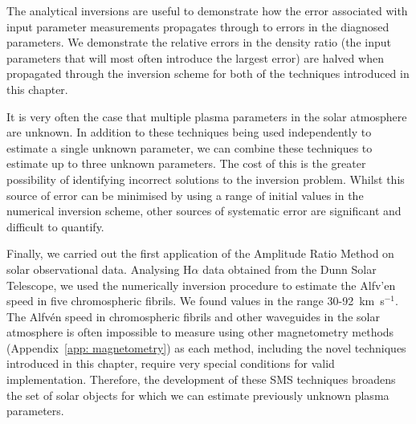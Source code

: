 The analytical inversions are useful to demonstrate how the error associated with input parameter measurements propagates through to errors in the diagnosed parameters. We demonstrate the relative errors in the density ratio (the input parameters that will most often introduce the largest error) are halved when propagated through the inversion scheme for both of the techniques introduced in this chapter.

It is very often the case that multiple plasma parameters in the solar atmosphere are unknown. In addition to these techniques being used independently to estimate a single unknown parameter, we can combine these techniques to estimate up to three unknown parameters. The cost of this is the greater possibility of identifying incorrect solutions to the inversion problem. Whilst this source of error can be minimised by using a range of initial values in the numerical inversion scheme, other sources of systematic error are significant and difficult to quantify.

Finally, we carried out the first application of the Amplitude Ratio Method on solar observational data. Analysing H$\alpha$ data obtained from the Dunn Solar Telescope, we used the numerically inversion procedure to estimate the Alfv'{e}n speed in five chromospheric fibrils. We found values in the range 30-92~km~s$^{-1}$. The Alfv\'{e}n speed in chromospheric fibrils and other waveguides in the solar atmosphere is often impossible to measure using other magnetometry methods (Appendix~\ref{app: magnetometry}) as each method, including the novel techniques introduced in this chapter, require very special conditions for valid implementation. Therefore, the development of these SMS techniques broadens the set of solar objects for which we can estimate previously unknown plasma parameters.